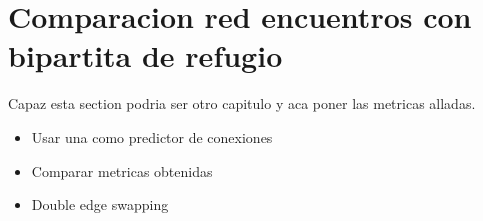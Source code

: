 \section{Comparacion red encuentros con bipartita de refugio}
Capaz esta section podria ser otro capitulo y aca poner las metricas alladas.
\begin{itemize}
    \item Usar una como predictor de conexiones 
    \item Comparar metricas obtenidas 
    \item Double edge swapping 
\end{itemize}
